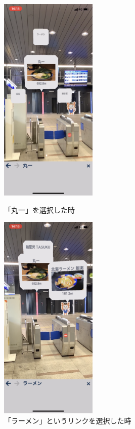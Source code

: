 \begin{figure}[h]
  \begin{minipage}{0.5\hsize}
    \centering
    \includegraphics[height=100mm]{images/nishiya_maruichi_ar.png}
    \caption{「丸一」を選択した時} \label{fig:nishiya_maruichi_ar}
  \end{minipage}
  \begin{minipage}{0.5\hsize}
    \centering
    \includegraphics[height=100mm]{images/nishiya_ramen_ar.png}
    \caption{「ラーメン」というリンクを選択した時} \label{fig:nishiya_ramen_ar}
  \end{minipage}
\end{figure}

